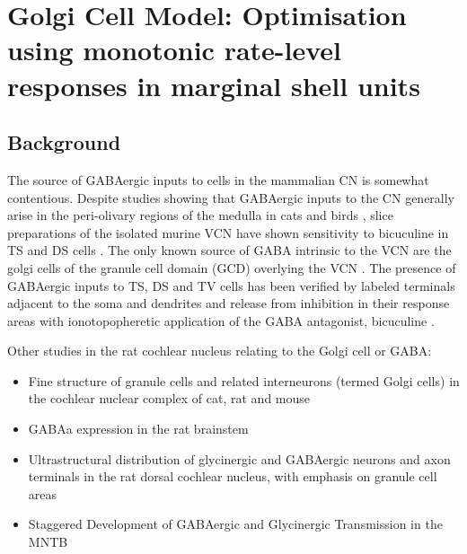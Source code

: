 

\graphicspath{{/media/data/Work/cnstellate/golgi/}{/media/data/Work/Responses/}{/media/data/Work/cnstellate/Responses/}{../figures/}{./gfx/}}

\section[Golgi Cell Model]{Golgi Cell Model: Optimisation using
  monotonic rate-level responses in marginal shell units}
\label{sec:golgi-cell-model}

\subsection{Background}

The source of GABAergic inputs to cells in the mammalian CN is
somewhat contentious. Despite studies showing that GABAergic inputs to
the CN generally arise in the peri-olivary regions of the medulla in
cats \citep{OstapoffBensonEtAl:1997} and birds
\citep{LachicaRubsamenEtAl:1995,YangMonsivaisEtAl:1999}, slice
preparations of the isolated murine VCN have shown sensitivity to
bicuculine in TS and DS cells \citep{FerragamoGoldingEtAl:1998a}.  The
only known source of GABA intrinsic to the VCN are the golgi cells of
the granule cell domain (GCD) overlying the VCN
\citep[Fig.~\ref{fig:CNdiagram}]{Mugnaini:1985,FerragamoGoldingEtAl:1998}.
The presence of GABAergic inputs to TS, DS and TV cells has been
verified by labeled terminals adjacent to the soma and dendrites
\citep{SmithRhode:1989,AwatramaniTurecekEtAl:2005,BabalianRyugoEtAl:2003}
and release from inhibition in their response areas with
ionotopopheretic application of the GABA antagonist, bicuculine
\citep{EvansZhao:1998,CasparyBackoffEtAl:1994,BackoffShadduckEtAl:1999,FerragamoGoldingEtAl:1998a}.

\medskip{}

Other studies in the rat cochlear nucleus relating to the Golgi cell or GABA:
\begin{itemize}
\item \citep{MugnainiOsenEtAl:1980} Fine structure of granule cells
  and related interneurons (termed {Golgi} cells) in the cochlear
  nuclear complex of cat, rat and mouse
\item GABAa expression in the rat brainstem  \citep{CamposCaboEtAl:2001}
\item \citep{Alibardi:2003a} Ultrastructural distribution of
  glycinergic and {{GABAergic}} neurons and axon terminals in the rat
  dorsal cochlear nucleus, with emphasis on granule cell areas
\item \citep{AwatramaniTurecekEtAl:2005} Staggered {Development} of
  {GABAergic} and {Glycinergic} {Transmission} in the {MNTB}
\end{itemize}


